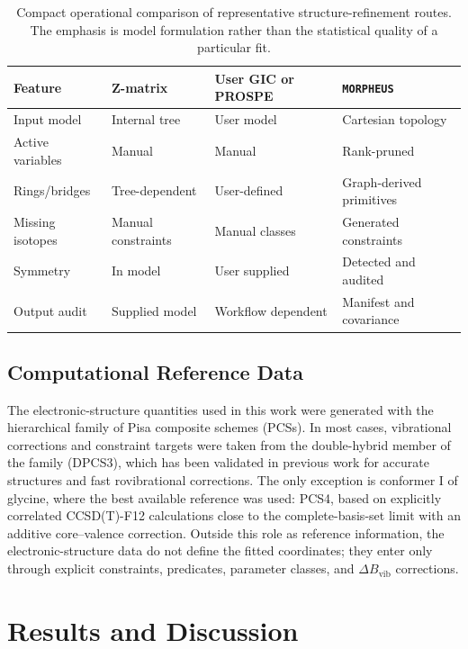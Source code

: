 \documentclass[aip,jcp,reprint,longbibliography,floatfix]{revtex4-2}
\begin{document}
\begin{table}
\caption{Compact operational comparison of representative
structure-refinement routes. The emphasis is model formulation rather than the
statistical quality of a particular fit.}
\label{tab:workflow-comparison}
\scriptsize
\setlength{\tabcolsep}{4pt}
\begin{tabular}{@{}llll@{}}
\toprule
Feature & Z-matrix & User GIC or PROSPE & \texttt{MORPHEUS} \\
\midrule
Input model & Internal tree & User model & Cartesian topology \\
Active variables & Manual & Manual & Rank-pruned \\
Rings/bridges & Tree-dependent & User-defined & Graph-derived primitives \\
Missing isotopes & Manual constraints & Manual classes & Generated constraints \\
Symmetry & In model & User supplied & Detected and audited \\
Output audit & Supplied model & Workflow dependent & Manifest and covariance \\
\bottomrule
\end{tabular}
\end{table}


\subsection{Computational Reference Data}

The electronic-structure quantities used in this work were generated with the
hierarchical family of Pisa composite schemes (PCSs). In most cases,
vibrational corrections and constraint targets were taken from the
double-hybrid member of the family (DPCS3), which has been validated in
previous work for accurate structures and fast rovibrational corrections. The
only exception is conformer I of glycine, where the best available reference
was used: PCS4, based on explicitly correlated CCSD(T)-F12 calculations close
to the complete-basis-set limit with an additive core--valence correction.
Outside this role as reference information, the electronic-structure data do
not define the fitted coordinates; they enter only through explicit
constraints, predicates, parameter classes, and $\Delta B_\mathrm{vib}$
corrections.


\section{Results and Discussion}
\end{document}
